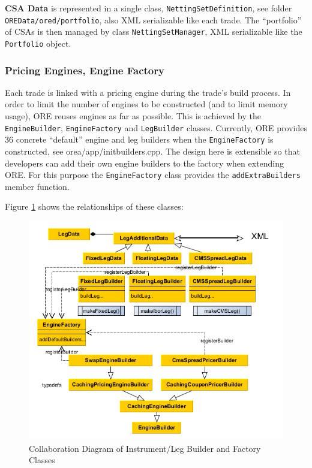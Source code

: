\documentclass[12pt, a4paper]{report}
\begin{document}
{\bf CSA Data} is represented in a single class, {\tt NettingSetDefinition}, see folder {\tt OREData/ored/portfolio}, also XML serializable like each trade. The ``portfolio'' of CSAs is then managed by class {\tt NettingSetManager}, 
XML serializable like the {\tt Portfolio} object.

\subsubsection{Pricing Engines, Engine Factory}
Each trade is linked with a pricing engine during the trade's build process. In order to limit the number of engines to be constructed (and to limit memory usage), ORE reuses engines as far as possible. This is achieved by the {\tt EngineBuilder},
{\tt EngineFactory} and {\tt LegBuilder} classes. Currently, ORE provides 36 concrete ``default'' engine and leg builders when the {\tt EngineFactory} is constructed, see orea/app/initbuilders.cpp. The design here is extensible so that developers can add their own engine builders to the
factory when extending ORE. For this purpose the {\tt EngineFactory} class provides the {\tt addExtraBuilders} member function.

Figure \ref{fig_OREDPortfolio} shows the relationships of these classes:

\begin{figure}[h]
\begin{center}
\includegraphics[scale=0.6]{data/ORED_Portfolio}
\end{center}
\caption{Collaboration Diagram of Instrument/Leg Builder and Factory Classes}
\label{fig_OREDPortfolio}
\end{figure}
\end{document}
